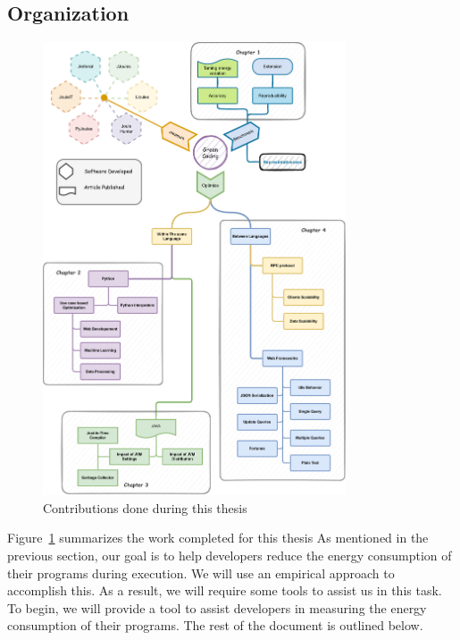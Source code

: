 \subsection{Organization}
\begin{figure}[!h]
    \centering
    \includegraphics[width=0.8\textwidth,height=\textheight,keepaspectratio]{chapters/thesis_contributions.pdf}
    \caption{Contributions done during this thesis }
    \label{fig:thesis_contributions}
\end{figure}

Figure~\ref{fig:thesis_contributions} summarizes the work completed for this thesis As mentioned in the previous section, our goal is to help developers reduce the energy consumption of their programs during execution.
We will use an empirical approach to accomplish this. As a result, we will require some tools to assist us in this task. To begin, we will provide a tool to assist developers in measuring the energy consumption of their programs. The rest of the document is outlined below.

